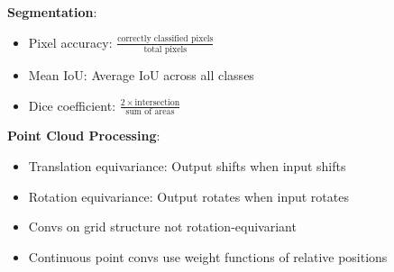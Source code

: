 \documentclass{article}
\begin{document}
\begin{multicols}{3}
\textbf{Segmentation}:
\begin{itemize}
\item Pixel accuracy: $\frac{\text{correctly classified pixels}}{\text{total pixels}}$
\item Mean IoU: Average IoU across all classes
\item Dice coefficient: $\frac{2 \times \text{intersection}}{\text{sum of areas}}$
\end{itemize}

\textbf{Point Cloud Processing}:
\begin{itemize}
\item Translation equivariance: Output shifts when input shifts
\item Rotation equivariance: Output rotates when input rotates 
\item Convs on grid structure not rotation-equivariant
\item Continuous point convs use weight functions of relative positions
\end{itemize}

\end{multicols}
\end{document}
